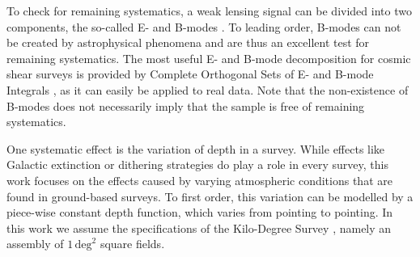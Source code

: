 \documentclass[referee]{aa} %
\renewcommand{\[}{\begin{equation}}
\renewcommand{\]}{\end{equation}}
\begin{document}
To check for remaining systematics, a weak lensing signal can be divided into two components, the so-called E- and B-modes \citep{2002ApJ...568...20C,2002A&A...389..729S}. To leading order, B-modes can not be created by astrophysical phenomena and are thus an excellent test for remaining systematics. The most useful E- and B-mode decomposition for cosmic shear surveys is provided by Complete Orthogonal Sets of E- and B-mode Integrals \citep[COSEBIs,][hereafter S10]{2010A&A...520A.116S}, as it can easily be applied to real data. Note that the non-existence of B-modes does not necessarily imply that the sample is free of remaining systematics.

One systematic effect is the variation of depth in a survey. While effects like Galactic extinction or dithering strategies do play a role in every survey, this work focuses on the effects caused by varying atmospheric conditions that are found in ground-based surveys. To first order, this variation can be modelled by a piece-wise constant depth function, which varies from pointing to pointing. In this work we assume the specifications of the Kilo-Degree Survey \citep[KiDS,][]{Kuijken:2015}, namely an assembly of $1\,\text{deg}^2$ square fields. 
\end{document}

